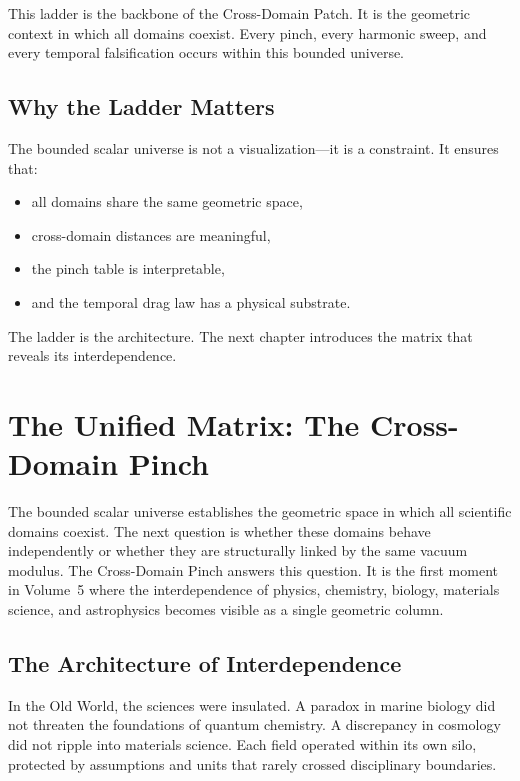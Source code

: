 \documentclass[11pt, letterpaper, openany]{book}
\begin{document}
This ladder is the backbone of the Cross-Domain Patch. It is the geometric context in which all
domains coexist. Every pinch, every harmonic sweep, and every temporal falsification occurs within
this bounded universe.

\section*{Why the Ladder Matters}
The bounded scalar universe is not a visualization—it is a constraint. It ensures that:

\begin{itemize}
    \item all domains share the same geometric space,
    \item cross-domain distances are meaningful,
    \item the pinch table is interpretable,
    \item and the temporal drag law has a physical substrate.
\end{itemize}

The ladder is the architecture.  
The next chapter introduces the matrix that reveals its interdependence.

\chapter{The Unified Matrix: The Cross-Domain Pinch}

The bounded scalar universe establishes the geometric space in which all scientific domains coexist.
The next question is whether these domains behave independently or whether they are structurally
linked by the same vacuum modulus. The Cross-Domain Pinch answers this question. It is the first
moment in Volume~5 where the interdependence of physics, chemistry, biology, materials science,
and astrophysics becomes visible as a single geometric column.

\section*{The Architecture of Interdependence}
In the Old World, the sciences were insulated. A paradox in marine biology did not threaten the
foundations of quantum chemistry. A discrepancy in cosmology did not ripple into materials
science. Each field operated within its own silo, protected by assumptions and units that rarely
crossed disciplinary boundaries.
\end{document}
